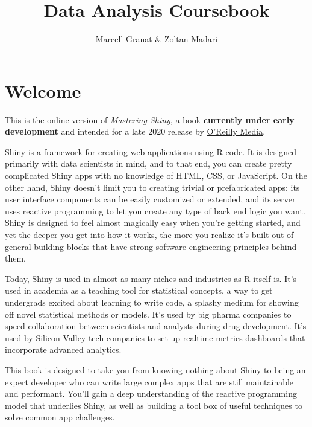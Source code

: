 \documentclass[
]{article}
\title{\textbf{Data Analysis} Coursebook}
\author{Marcell Granat \& Zoltan Madari}
\date{}
\begin{document}
\maketitle



{
\setcounter{tocdepth}{2}
\tableofcontents
}
\pagebreak

\hypertarget{welcome}{%
\section*{Welcome}\label{welcome}}

This is the online version of \emph{Mastering Shiny}, a book \textbf{currently under early development} and intended for a late 2020 release by \href{https://www.oreilly.com/}{O'Reilly Media}.

\href{https://shiny.rstudio.com/}{Shiny} is a framework for creating web applications using R code.
It is designed primarily with data scientists in mind, and to that end, you can create pretty complicated Shiny apps with no knowledge of HTML, CSS, or JavaScript.
On the other hand, Shiny doesn't limit you to creating trivial or prefabricated apps: its user interface components can be easily customized or extended, and its server uses reactive programming to let you create any type of back end logic you want.
Shiny is designed to feel almost magically easy when you're getting started, and yet the deeper you get into how it works, the more you realize it's built out of general building blocks that have strong software engineering principles behind them.

Today, Shiny is used in almost as many niches and industries as R itself is.
It's used in academia as a teaching tool for statistical concepts, a way to get undergrads excited about learning to write code, a splashy medium for showing off novel statistical methods or models.
It's used by big pharma companies to speed collaboration between scientists and analysts during drug development.
It's used by Silicon Valley tech companies to set up realtime metrics dashboards that incorporate advanced analytics.

This book is designed to take you from knowing nothing about Shiny to being an expert developer who can write large complex apps that are still maintainable and performant.
You'll gain a deep understanding of the reactive programming model that underlies Shiny, as well as building a tool box of useful techniques to solve common app challenges.
\end{document}
